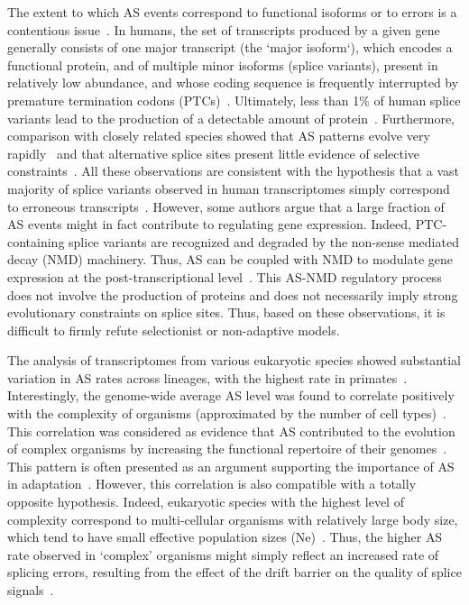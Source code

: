 The extent to which \acrshort{AS} events correspond to functional isoforms or to errors is a contentious issue~\citep{bhuiyan_systematic_2018, tress_most_2017, blencowe_relationship_2017, tress_alternative_2017}. In humans, the set of transcripts produced by a given gene generally consists of one major transcript (the ‘major isoform‘), which encodes a functional protein, and of multiple minor isoforms (splice variants), present in relatively low abundance, and whose coding sequence is frequently interrupted by premature termination codons (PTCs)~\citep{tress_alternative_2017,gonzalez-porta_transcriptome_2013}. Ultimately, less than 1\% of human splice variants lead to the production of a detectable amount of protein~\citep{abascal_alternatively_2015}. Furthermore, comparison with closely related species showed that \acrshort{AS} patterns evolve very rapidly~\citep{barbosa-morais_evolutionary_2012,merkin_evolutionary_2012} and that alternative splice sites present little evidence of selective constraints~\citep{pickrell_noisy_2010}. All these observations are consistent with the hypothesis that a vast majority of splice variants observed in human transcriptomes simply correspond to erroneous transcripts~\citep{pickrell_noisy_2010}. However, some authors argue that a large fraction of \acrshort{AS} events might in fact contribute to regulating gene expression. Indeed, PTC-containing splice variants are recognized and degraded by the non-sense mediated decay (NMD) machinery. Thus, \acrshort{AS} can be coupled with NMD to modulate gene expression at the post-transcriptional level~\citep{mcglincy_alternative_2008,hamid_emerging_2014}. This AS-NMD regulatory process does not involve the production of proteins and does not necessarily imply strong evolutionary constraints on splice sites. Thus, based on these observations, it is difficult to firmly refute selectionist or non-adaptive models.

The analysis of transcriptomes from various eukaryotic species showed substantial variation in \acrshort{AS} rates across lineages, with the highest rate in primates~\citep{barbosa-morais_evolutionary_2012,chen_correcting_2014, mazin_alternative_2021}. Interestingly, the genome-wide average \acrshort{AS} level was found to correlate positively with the complexity of organisms (approximated by the number of cell types)~\citep{chen_correcting_2014}. This correlation was considered as evidence that \acrshort{AS} contributed to the evolution of complex organisms by increasing the functional repertoire of their genomes~\citep{chen_correcting_2014}. This pattern is often presented as an argument supporting the importance of \acrshort{AS} in adaptation~\citep{verta_role_2022,singh_importance_2022, wright_alternative_2022}. However, this correlation is also compatible with a totally opposite hypothesis. Indeed, eukaryotic species with the highest level of complexity correspond to multi-cellular organisms with relatively large body size, which tend to have small effective population sizes (\acrshort{Ne})~\citep{lynch_origins_2003, figuet_life_2016}. Thus, the higher \acrshort{AS} rate observed in ‘complex’ organisms might simply reflect an increased rate of splicing errors, resulting from the effect of the drift barrier on the quality of splice signals~\citep{bush_alternative_2017}.

